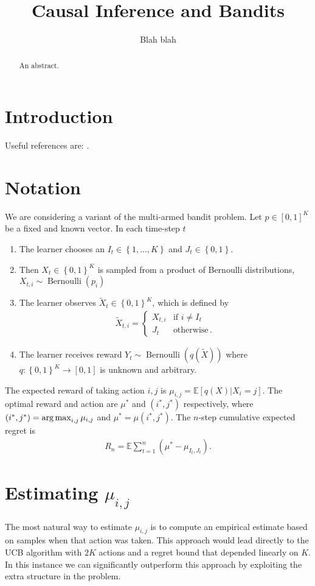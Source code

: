 \documentclass{article}
\title{Causal Inference and Bandits}
\author{Blah blah}
\newcommand{\E}{\mathbb E}
\newcommand{\set}[1]{\left\{#1\right\}}
\newcommand{\argmax}{\operatornamewithlimits{arg\,max}}
\newcommand{\eq}[1]{\begin{align*}#1\end{align*}}
\newcommand{\Ber}{\operatorname{Bernoulli}}
\theoremstyle{plain}
\theoremstyle{definition}
\begin{document}
\maketitle

\begin{abstract}
An abstract.
\end{abstract}

\section{Introduction}

Useful references are: \cite{BC12}.

\section{Notation}

We are considering a variant of the multi-armed bandit problem.
Let $p \in [0,1]^K$ be a fixed and known vector.
In each time-step $t$ 
\begin{enumerate}
\item The learner chooses an $I_t \in \set{1,\ldots, K}$ and $J_t \in \set{0,1}$.
\item Then $X_t \in \set{0,1}^K$ is sampled from a product of Bernoulli distributions, $X_{t,i} \sim \Ber(p_i)$ 
\item The learner observes $\tilde X_t \in \set{0,1}^K$, which is defined by 
\eq{
\tilde X_{t,i} = \begin{cases}
X_{t,i} &\text{if } i \neq I_t \\
J_t & \text{otherwise}\,.
\end{cases}
}
\item The learner receives reward $Y_t \sim \Ber(q(\tilde X))$ where $q:\set{0,1}^K \to [0,1]$ is unknown and arbitrary.
\end{enumerate}
The expected reward of taking action $i,j$ is $\mu_{i,j} = \E[q(X)|X_i = j]$. The optimal reward and action are $\mu^*$ and $(i^*,j^*)$ respectively,
where $(i^*,j^*) = \argmax_{i,j} \mu_{i,j}$ and $\mu^* = \mu(i^*,j^*)$. The $n$-step cumulative expected regret is
\eq{
R_n = \E \sum_{t=1}^n \left(\mu^* - \mu_{I_t,J_t}\right).
}

\section{Estimating $\mu_{i,j}$}
The most natural way to estimate $\mu_{i,j}$ is to compute an empirical estimate based on samples when that action was taken. This approach would
lead directly to the UCB algorithm with $2K$ actions and a regret bound that depended linearly on $K$. In this instance we can significantly
outperform this approach by exploiting the extra structure in the problem.
\end{document}
